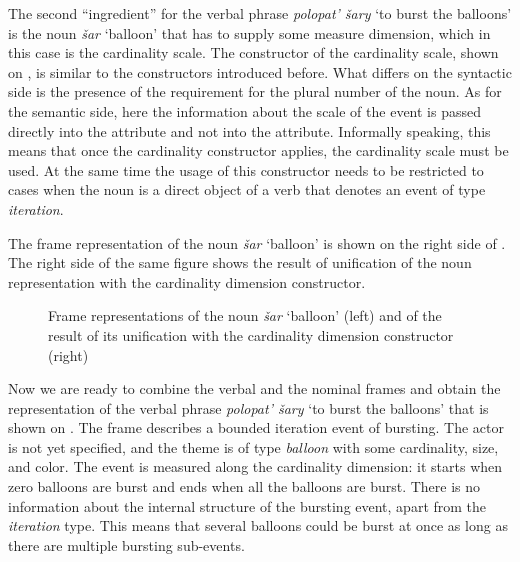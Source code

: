 The second ``ingredient'' for the verbal phrase \textit{polopat' \v{s}ary} `to burst the balloons' is the noun \textit{\v{s}ar} `balloon' that has to supply some measure dimension, which in this case is the cardinality scale. The constructor of the cardinality scale, shown on , is similar to the constructors introduced before. What differs on the syntactic side is the presence of the requirement for the plural number of the noun. As for the semantic side, here the information about the scale of the event is passed directly into the \MDIM attribute and not into the \NOUNDIM attribute. Informally speaking, this means that once the cardinality constructor applies, the cardinality scale must be used. At the same time the usage of this constructor needs to be restricted to cases when the noun is a direct object of a verb that denotes an event of type \textit{iteration}. 

The frame representation of the noun \textit{\v{s}ar} `balloon' is shown on the right side of . The right side of the same figure shows the result of unification of the noun representation with the cardinality dimension constructor.

\begin{figure}\small
\hfill%
\caption{Frame representations of the noun  \textit{\v{s}ar} `balloon' (left) and of the result of its unification with the cardinality dimension constructor (right) \label{frame:balloon}}
\end{figure}

Now we are ready to combine the verbal and the nominal frames and obtain the representation of the verbal phrase \textit{polopat' \v{s}ary} `to burst the balloons' that is shown on . The frame describes a bounded iteration event of bursting. The actor is not yet specified, and the theme is of type \textit{balloon} with some cardinality, size, and color. The event is measured along the cardinality dimension: it starts when zero balloons are burst and ends when all the balloons are burst. There is no information about the internal structure of the bursting event, apart from the \textit{iteration} type. This means that several balloons could be burst at once as long as there are multiple bursting sub-events.

